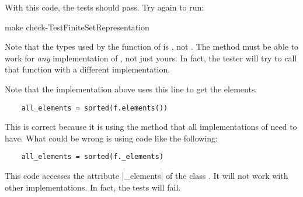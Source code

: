 With this code, the tests should pass.
Try again to run:

\begin{console}
    make check-TestFiniteSetRepresentation
\end{console}

Note that the types used by the function  of  is \FiniteSet,
not .
The method must be able to work for \emph{any} implementation of  \FiniteSet,
not just yours.
In fact, the tester will try to call that function with a different implementation.

Note that the implementation above uses this line to get the elements:

\begin{verbatim}
    all_elements = sorted(f.elements())
\end{verbatim}

This is correct because it is using the method  that all implementations of \FiniteSet need to have.
What could be wrong is using code like the following:

\begin{verbatim}
    all_elements = sorted(f._elements)
\end{verbatim}

This code accesses the attribute \pystr|_elements| of the class .
It will not work with other implementations.
In fact, the tests will fail.
